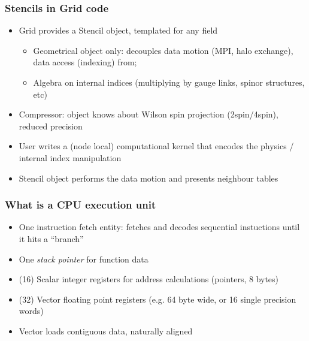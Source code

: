 \documentclass[pdf,ps,8pt]{beamer}
\begin{document}
\begin{frame}[fragile]\small\frametitle{Stencils in Grid code}

\begin{itemize}
\item Grid provides a Stencil object, templated for any field
\begin{itemize}
\item Geometrical object only: decouples data motion (MPI, halo exchange), data access (indexing) from;
\item Algebra on internal indices (multiplying by gauge links, spinor structures, etc)
\end{itemize}
\item Compressor: object knows about Wilson spin projection (2spin/4spin), reduced precision
\item User writes a (node local) computational kernel that encodes the physics / internal index manipulation
\item Stencil object performs the data motion and presents neighbour tables
\end{itemize}

\end{frame}

\begin{frame}[fragile]\small\frametitle{ What is a CPU execution unit}

  \begin{itemize}
  \item One instruction fetch entity: fetches and decodes sequential instuctions until it hits a ``branch''
  \item One \emph{stack pointer} for function data
  \item (16) Scalar integer registers for address calculations (pointers, 8 bytes)
  \item (32) Vector floating point registers (e.g. 64 byte wide, or 16 single precision words)
  \item Vector loads contiguous data, naturally aligned
    \end{itemize}
  
\end{frame}
\end{document}
